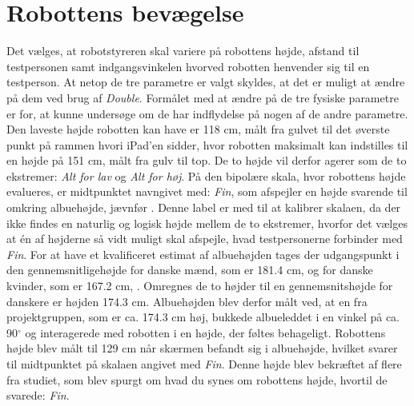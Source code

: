 \section{Robottens bevægelse}
\label{RobottensBevaegelse}
%
Det vælges, at robotstyreren skal variere på robottens højde, afstand til testpersonen samt indgangsvinkelen hvorved robotten henvender sig til en testperson. At netop de tre parametre er valgt skyldes, at det er muligt at ændre på dem ved brug af \textit{Double}. Formålet med at ændre på de tre fysiske parametre er for, at kunne undersøge om de har indflydelse på nogen af de andre parametre.\blankline
%
Den laveste højde robotten kan have er 118 cm, målt fra gulvet til det øverste punkt på rammen hvori iPad'en sidder, hvor robotten maksimalt kan indstilles til en højde på 151 cm, målt fra gulv til top. De to højde vil derfor agerer som de to ekstremer: \textit{Alt for lav} og \textit{Alt for høj}. På den bipolære skala, hvor robottens højde evalueres, er midtpunktet navngivet med: \textit{Fin}, som afspejler en højde svarende til omkring albuehøjde, jævnfør . Denne label er med til at kalibrer skalaen, da der ikke findes en naturlig og logisk højde mellem de to ekstremer, hvorfor det vælges at én af højderne så vidt muligt skal afspejle, hvad testpersonerne forbinder med \textit{Fin}. For at have et kvalificeret estimat af albuehøjden tages der udgangspunkt i den gennemsnitligehøjde for danske mænd, som er 181.4 cm, og for danske kvinder, som er 167.2 cm, \parencite{WEB:DanskersHoejde}. Omregnes de to højder til en gennemsnitshøjde for danskere er højden 174.3 cm. Albuehøjden blev derfor målt ved, at en fra projektgruppen, som er ca. 174.3 cm høj, bukkede albueleddet i en vinkel på ca. 90$^\circ$ og interagerede med robotten i en højde, der føltes behageligt. Robottens højde blev målt til 129 cm når skærmen befandt sig i albuehøjde, hvilket svarer til midtpunktet på skalaen angivet med \textit{Fin}. Denne højde blev bekræftet af flere fra studiet, som blev spurgt om hvad du synes om robottens højde, hvortil de svarede: \textit{Fin}. 

